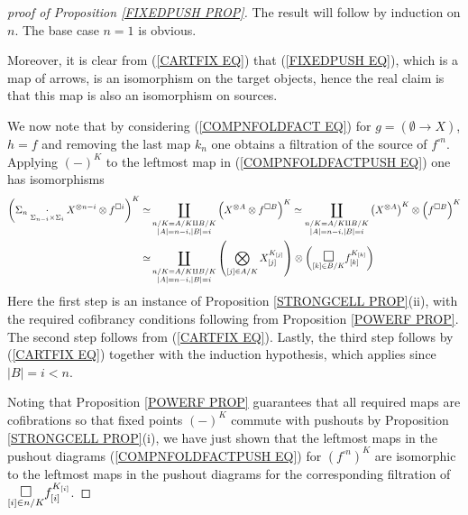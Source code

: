 \documentclass[a4paper,10pt]{article}%
\begin{document}
\begin{proof}[proof of Proposition \ref{FIXEDPUSH PROP}]
The result will follow by induction on $n$. The base case $n=1$ is obvious.

Moreover, it is clear from (\ref{CARTFIX EQ}) that (\ref{FIXEDPUSH EQ}), which is a map of arrows, is an isomorphism on the target objects, hence the real claim is that this map is also an isomorphism on sources.

We now note that by considering (\ref{COMPNFOLDFACT EQ}) for
$g= (\emptyset \to X)$, $h=f$ and removing the last map $k_n$
one obtains a filtration of the source of $f^{\square n}$.
Applying $(\minus)^K$ to the leftmost map in 
(\ref{COMPNFOLDFACTPUSH EQ})
one has isomorphisms
\begin{align*}
	\left(
	\Sigma_n \underset{\Sigma_{n-i} \times \Sigma_i}
	{\cdot} X^{\otimes n-i} \otimes f^{\square i}
	\right)^K
\simeq &
	\coprod_{\substack{n/K=A/K \amalg B/K \\
	|A|=n-i,|B|=i}}
	\left( X^{\otimes A} \otimes f^{\square B} \right)^K
\simeq
	\coprod_{\substack{n/K=A/K \amalg B/K \\
	|A|=n-i,|B|=i}} 
	\left( X^{\otimes A}\right)^K \otimes \left( f^{\square B} \right)^K
\\
\simeq &
	\coprod_{\substack{n/K=A/K \amalg B/K \\
	|A|=n-i,|B|=i}} 
	\left(
	\bigotimes_{[j]\in A/K} X_{[j]}^{K_{[j]}}
	\right)
\otimes 
	\left(
	\underset{[k] \in B/K}
	{\mathlarger{\mathlarger{\square}}}
	f_{[k]}^{K_{[k]}}
	\right)
\end{align*}
Here the first step is an instance of Proposition \ref{STRONGCELL PROP}(ii),
with the required cofibrancy conditions following from Proposition \ref{POWERF PROP}. The second step follows from (\ref{CARTFIX EQ}).
Lastly, the third step follows by
(\ref{CARTFIX EQ}) together with the induction hypothesis, which applies since $|B|=i<n$.

Noting that Proposition \ref{POWERF PROP} guarantees that all required maps are cofibrations
so that fixed points $(\minus)^K$ commute with pushouts by Proposition \ref{STRONGCELL PROP}(i),
we have just shown that 
the leftmost maps in the pushout diagrams (\ref{COMPNFOLDFACTPUSH EQ}) for 
$\left( f^{\square n} \right)^K$
are isomorphic to the leftmost maps in the pushout diagrams for the corresponding filtration of 	
$\underset{[i] \in n/K}{\mathlarger{\mathlarger{\square}}}
 f_{[i]}^{K_{[i]}}$.
\end{proof}
\end{document}

